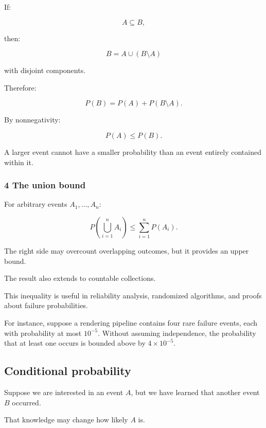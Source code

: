 \hypertarget{02-foundations-ii-ch023-deriving-monotonicity}{}

If:

\[
 A\subseteq B,
\]

then:

\[
 B=A\cup(B\setminus A)
\]

with disjoint components.

Therefore:

\[
 P(B)=P(A)+P(B\setminus A).
\]

By nonnegativity:

\[
 \boxed{P(A)\le P(B)}.
\]

A larger event cannot have a smaller probability than an event entirely contained within it.

\subsubsection{4 The union bound}\label{02-foundations-ii-ch023-the-union-bound}

\hypertarget{02-foundations-ii-ch023-the-union-bound}{}

For arbitrary events \(A_1,\ldots,A_n\):

\[
 \boxed{ P\left(\bigcup_{i=1}^{n}A_i\right) \le \sum_{i=1}^{n}P(A_i) }.
\]

The right side may overcount overlapping outcomes, but it provides an upper bound.

The result also extends to countable collections.

This inequality is useful in reliability analysis, randomized algorithms, and proofs about failure probabilities.

For instance, suppose a rendering pipeline contains four rare failure events, each with probability at most \(10^{-5}\). Without assuming independence, the probability that at least one occurs is bounded above by \(4\times10^{-5}\).

\subsection{Conditional probability}\label{02-foundations-ii-ch023-conditional-probability}

\hypertarget{02-foundations-ii-ch023-conditional-probability}{}

Suppose we are interested in an event \(A\), but we have learned that another event \(B\) occurred.

That knowledge may change how likely \(A\) is.

